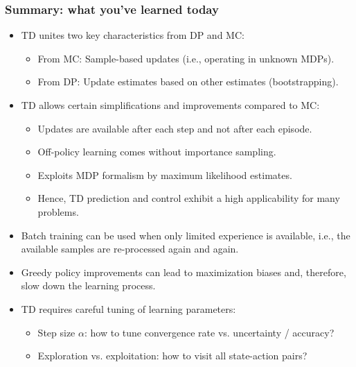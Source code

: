 \begin{frame}
  \frametitle{Summary: what you've learned today}
  \begin{itemize}
  \item TD unites two key characteristics from DP and MC:
    \begin{itemize}
    \item From MC: Sample-based updates (i.e., operating in unknown MDPs).
    \item From DP: Update estimates based on other estimates (bootstrapping).
    \end{itemize}\pause
  \item TD allows certain simplifications and improvements compared to MC:
    \begin{itemize}
    \item Updates are available after each step and not after each episode.\pause
    \item Off-policy learning comes without importance sampling.\pause
    \item Exploits MDP formalism by maximum likelihood estimates. \pause
    \item Hence, TD prediction and control exhibit a high applicability for many problems.\pause
    \end{itemize}
  \item Batch training can be used when only limited experience is available, i.e., the available samples are re-processed again and again.\pause
  \item Greedy policy improvements can lead to maximization biases and, therefore, slow down the learning process. \pause
  \item TD requires careful tuning of learning parameters:
    \begin{itemize}
    \item Step size $\alpha$: how to tune convergence rate vs. uncertainty / accuracy?
    \item Exploration vs. exploitation: how to visit all state-action pairs?
    \end{itemize}
  \end{itemize}
\end{frame}
